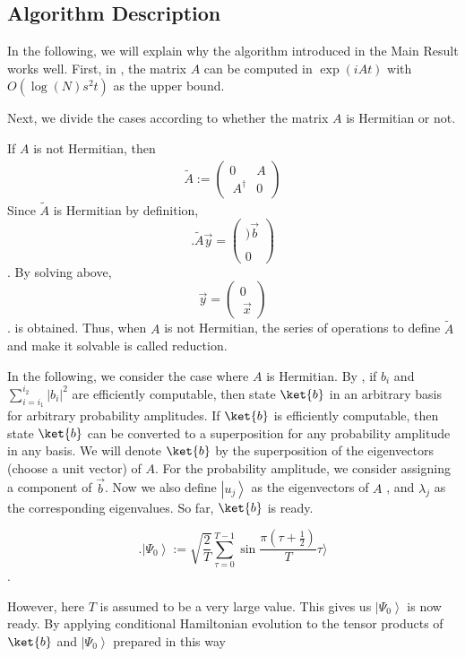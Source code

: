 \documentclass[b5paper,papersize,dvipdfmx,fleqn]{article}
\begin{document}
\subsection{Algorithm Description}

In the following, we will explain why the algorithm introduced in the Main Result works well. First, in \cite{Berry2007}, the matrix $A$ can be computed in $\exp(iAt)$ with $O(\log(N)s^2t)$ as the upper bound.

Next, we divide the cases according to whether the matrix $A$ is Hermitian or not.

If $A$ is not Hermitian, then
\begin{eqnarray}
  \tilde{A}:= \left(\begin{array}{cc}
0 & A \\\
A^{\dagger} & 0
\end{array}\right)
\end{eqnarray}
Since $\tilde{A}$ is Hermitian by definition,
$$.
\tilde{A} \vec{y}=\left(\begin{array}{l})
\vec{b}\\\\
0
\end{array}\right)
$$.
By solving above,
$$
\vec{y}=\left(\begin{array}{l}
0 \\\
\vec{x}
\end{array}\right)
$$.
is obtained. Thus, when $A$ is not Hermitian, the series of operations to define $\tilde{A}$ and make it solvable is called reduction.

In the following, we consider the case where $A$ is Hermitian. By \cite{Grover2002}, if $b_{i}$ and $\sum_{i=i_{1}}^{i_{2}}\left|b_{i}\right|^{2}$ are efficiently computable, then state $\ket{b}$ in an arbitrary basis for arbitrary probability amplitudes. If $\ket{b}$ is efficiently computable, then state $\ket{b}$ can be converted to a superposition for any probability amplitude in any basis. We will denote $\ket{b}$ by the superposition of the eigenvectors (choose a unit vector) of $A$. For the probability amplitude, we consider assigning a component of $\vec{b}$. Now we also define $\left|u_{j}\right\rangle$ as the eigenvectors of $A$ , and $\lambda_{j}$ as the corresponding eigenvalues. So far, $\ket{b}$ is ready.

$$.
\left|\Psi_{0}\right\rangle:=\sqrt{\frac{2}{T}}\sum_{\tau=0}^{T-1}\sin \frac{\pi\left(\tau+\frac{1}{2}\right)}{T}\tau\rangle
$$.

However, here $T$ is assumed to be a very large value. This gives us $\left|\Psi_{0}\right\rangle$ is now ready. By applying conditional Hamiltonian evolution to the tensor products of $\ket{b}$ and $\left|\Psi_{0}\right\rangle$ prepared in this way
\end{document}

